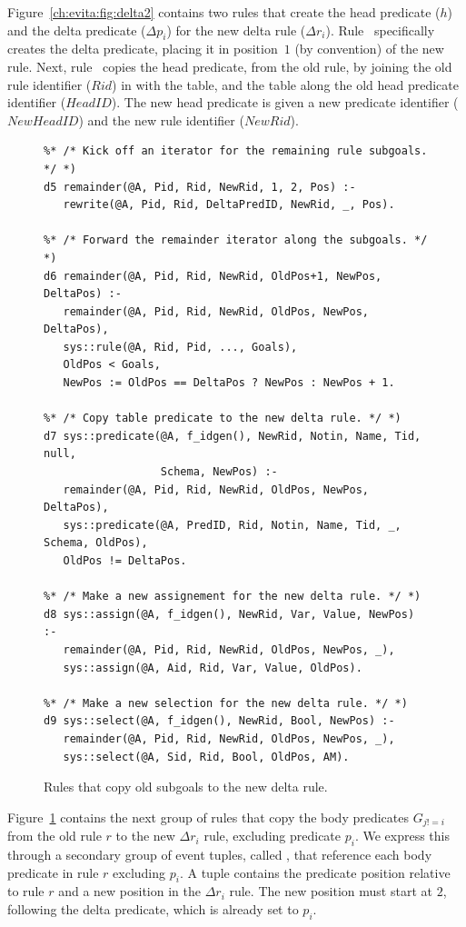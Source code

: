 Figure~\ref{ch:evita:fig:delta2} contains two rules that create the head
predicate ($h$) and the delta predicate ($\Delta p_i$) for the new delta rule
($\Delta r_i$).  Rule~ specifically creates the delta predicate, placing
it in position~$1$ (by convention) of the new rule.  Next, rule~ copies
the head predicate, from the old rule, by joining the old rule identifier
($Rid$) in  with the  table, and the  table
along the old head predicate identifier ($HeadID$).  The new head predicate is
given a new predicate identifier ($NewHeadID$) and the new rule identifier
($NewRid$).


\begin{figure}
\ssp
\centering
\begin{lstlisting}
%* /* Kick off an iterator for the remaining rule subgoals. */ *)
d5 remainder(@A, Pid, Rid, NewRid, 1, 2, Pos) :-
   rewrite(@A, Pid, Rid, DeltaPredID, NewRid, _, Pos).

%* /* Forward the remainder iterator along the subgoals. */ *)
d6 remainder(@A, Pid, Rid, NewRid, OldPos+1, NewPos, DeltaPos) :-
   remainder(@A, Pid, Rid, NewRid, OldPos, NewPos, DeltaPos),
   sys::rule(@A, Rid, Pid, ..., Goals),
   OldPos < Goals,
   NewPos := OldPos == DeltaPos ? NewPos : NewPos + 1.

%* /* Copy table predicate to the new delta rule. */ *)
d7 sys::predicate(@A, f_idgen(), NewRid, Notin, Name, Tid, null, 
                  Schema, NewPos) :-
   remainder(@A, Pid, Rid, NewRid, OldPos, NewPos, DeltaPos),
   sys::predicate(@A, PredID, Rid, Notin, Name, Tid, _, Schema, OldPos),
   OldPos != DeltaPos.

%* /* Make a new assignement for the new delta rule. */ *)
d8 sys::assign(@A, f_idgen(), NewRid, Var, Value, NewPos) :-
   remainder(@A, Pid, Rid, NewRid, OldPos, NewPos, _),
   sys::assign(@A, Aid, Rid, Var, Value, OldPos).

%* /* Make a new selection for the new delta rule. */ *)
d9 sys::select(@A, f_idgen(), NewRid, Bool, NewPos) :-
   remainder(@A, Pid, Rid, NewRid, OldPos, NewPos, _),
   sys::select(@A, Sid, Rid, Bool, OldPos, AM).

\end{lstlisting}
\caption{\label{ch:evita:fig:delta3}Rules that copy old subgoals to the new 
delta rule.}
\end{figure}

Figure~\ref{ch:evita:fig:delta3} contains the next group of rules that copy the
body predicates $G_{j!=i}$ from the old rule $r$ to the new $\Delta r_i$ rule,
excluding predicate $p_i$.  We express this through a secondary group of event
tuples, called , that reference each body predicate in rule $r$
excluding $p_i$.  A  tuple contains the predicate position
relative to rule $r$ and a new position in the $\Delta r_i$ rule.  The new
position must start at $2$, following the delta predicate, which is already set
to $p_i$.

